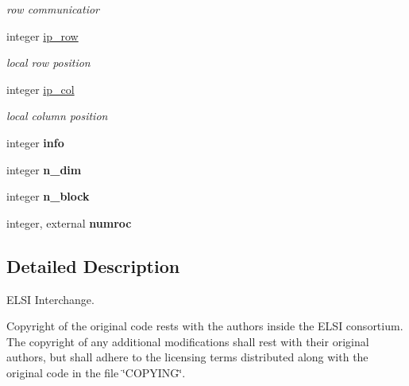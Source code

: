 \begin{DoxyCompactItemize}
\begin{DoxyCompactList}\small\item\em row communicatior \end{DoxyCompactList}\item 
\hypertarget{namespacempi__tools_a4b6986f5ffa5ee2a0afc9ab017557061}{}integer \hyperlink{namespacempi__tools_a4b6986f5ffa5ee2a0afc9ab017557061}{ip\+\_\+row}\label{namespacempi__tools_a4b6986f5ffa5ee2a0afc9ab017557061}

\begin{DoxyCompactList}\small\item\em local row position \end{DoxyCompactList}\item 
\hypertarget{namespacempi__tools_ab56aed4a79e8219b6a417511c5ff8539}{}integer \hyperlink{namespacempi__tools_ab56aed4a79e8219b6a417511c5ff8539}{ip\+\_\+col}\label{namespacempi__tools_ab56aed4a79e8219b6a417511c5ff8539}

\begin{DoxyCompactList}\small\item\em local column position \end{DoxyCompactList}\item 
\hypertarget{namespacempi__tools_a7abd18507f3403e91e42fc739b4a8b1b}{}integer {\bfseries info}\label{namespacempi__tools_a7abd18507f3403e91e42fc739b4a8b1b}

\item 
\hypertarget{namespacempi__tools_acbc2f0ef45644bb20bfe5af7662fe45d}{}integer {\bfseries n\+\_\+dim}\label{namespacempi__tools_acbc2f0ef45644bb20bfe5af7662fe45d}

\item 
\hypertarget{namespacempi__tools_a877feb7ffc11725c8f33b76add2956f5}{}integer {\bfseries n\+\_\+block}\label{namespacempi__tools_a877feb7ffc11725c8f33b76add2956f5}

\item 
\hypertarget{namespacempi__tools_a3affe5df388ed8093ebfd5d87f8c2827}{}integer, external {\bfseries numroc}\label{namespacempi__tools_a3affe5df388ed8093ebfd5d87f8c2827}

\end{DoxyCompactItemize}


\subsection{Detailed Description}
E\+L\+S\+I Interchange. 

Copyright of the original code rests with the authors inside the E\+L\+S\+I consortium. The copyright of any additional modifications shall rest with their original authors, but shall adhere to the licensing terms distributed along with the original code in the file \char`\"{}\+C\+O\+P\+Y\+I\+N\+G\char`\"{}. 

